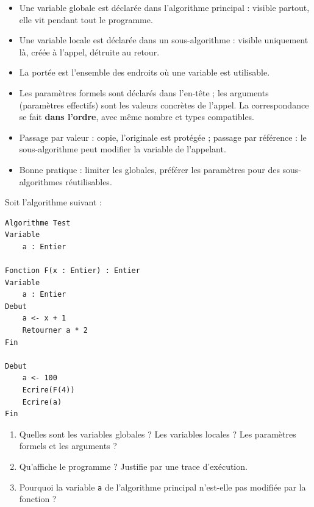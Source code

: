 \documentclass[11pt]{article}
\newcommand{\cle}[1]{{\popxbold\color{popdark}#1}}
\begin{document}
\begin{aretenir}
\begin{itemize}
  \item Une \cle{variable globale} est déclarée dans l'algorithme principal : visible partout, elle vit pendant tout le programme.
  \item Une \cle{variable locale} est déclarée dans un sous-algorithme : visible uniquement là, créée à l'appel, détruite au retour.
  \item La \cle{portée} est l'ensemble des endroits où une variable est utilisable.
  \item Les \cle{paramètres formels} sont déclarés dans l'en-tête ; les \cle{arguments} (paramètres effectifs) sont les valeurs concrètes de l'appel. La correspondance se fait \textbf{dans l'ordre}, avec même nombre et types compatibles.
  \item Passage \cle{par valeur} : copie, l'originale est protégée ; passage \cle{par référence} : le sous-algorithme peut modifier la variable de l'appelant.
  \item Bonne pratique : limiter les globales, préférer les paramètres pour des sous-algorithmes réutilisables.
\end{itemize}
\end{aretenir}

\begin{exercice}
Soit l'algorithme suivant :
\begin{lstlisting}
Algorithme Test
Variable
    a : Entier

Fonction F(x : Entier) : Entier
Variable
    a : Entier
Debut
    a <- x + 1
    Retourner a * 2
Fin

Debut
    a <- 100
    Ecrire(F(4))
    Ecrire(a)
Fin
\end{lstlisting}
\begin{enumerate}
  \item Quelles sont les variables globales ? Les variables locales ? Les paramètres formels et les arguments ?
  \item Qu'affiche le programme ? Justifie par une trace d'exécution.
  \item Pourquoi la variable \texttt{a} de l'algorithme principal n'est-elle pas modifiée par la fonction ?
\end{enumerate}
\end{exercice}
\end{document}
